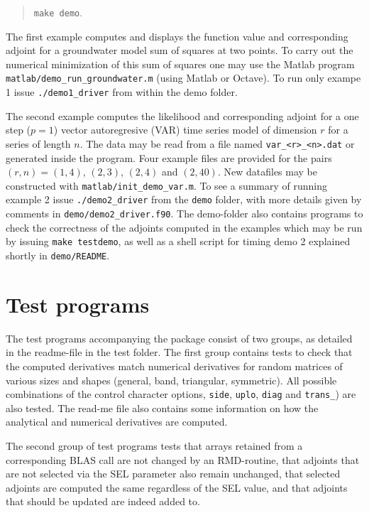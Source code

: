 \documentclass[a4paper]{article}
\begin{document}
\begin{quote}
\texttt{make demo}.
\end{quote}

\noindent
The first example computes and displays the function value and corresponding
adjoint for a groundwater model sum of squares at two points. To carry out the
numerical minimization of this sum of squares one may use the Matlab program
\texttt{matlab/demo\_run\_groundwater.m} (using Matlab or Octave). To
run only exampe 1 issue \texttt{./demo1\_driver} from within the demo folder.

The second example computes the likelihood and corresponding adjoint for
a one step ($p=1$) vector autoregresive (VAR) time series model of dimension $r$
for a series of length $n$. The data may be read from a file named
\texttt{var\_<r>\_<n>.dat} or generated inside the program. Four example files
are provided for the pairs $(r,n) = (1,4)$, $(2,3)$, $(2,4)$ and $(2,40)$. New
datafiles may be constructed with \texttt{matlab/init\_demo\_var.m}. To see a
summary of running example 2 issue \texttt{./demo2\_driver} from the
\texttt{demo} folder, with more details given by comments in
\texttt{demo/demo2\_driver.f90}. The demo-folder also contains programs to check
the correctness of the adjoints computed in the examples which may be run by
issuing \texttt{make testdemo}, as well as a shell script for timing demo 2
explained shortly in \texttt{demo/README}.


\section{Test programs}
The test programs accompanying the package consist of two groups, as detailed in
the readme-file in the test folder. The first group contains tests to check that
the computed derivatives match numerical derivatives for random matrices of
various sizes and shapes (general, band, triangular, symmetric). All possible
combinations of the control character options, \texttt{side}, \texttt{uplo},
\texttt{diag} and \texttt{trans\_}) are also tested. The read-me file also
contains some information on how the analytical and numerical
derivatives are computed.

The second group of test programs tests that arrays retained from a
corresponding BLAS call are not changed by an RMD-routine, that adjoints that
are not selected via the SEL parameter also remain unchanged, that selected
adjoints are computed the same regardless of the SEL value, and that
adjoints that should be updated are indeed added to.
\end{document}
